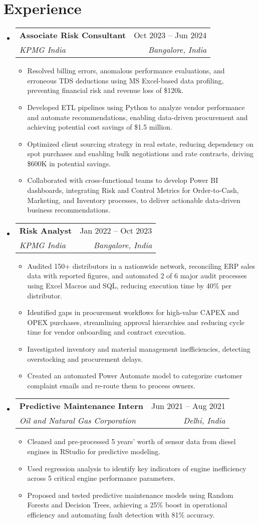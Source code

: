 \documentclass[letterpaper,11pt]{article}
\makeatletter
\newcommand{\resumeItem}[1]{
  \item\small{
    {#1 \vspace{-2pt}}
  }
}
\newcommand{\resumeSubheading}[4]{
  \vspace{-2pt}\item
    \begin{tabular*}{0.97\textwidth}[t]{l@{\extracolsep{\fill}}r}
      \textbf{#1} & #2 \\
      \textit{\small#3} & \textit{\small #4} \\
    \end{tabular*}\vspace{-7pt}
}
\newcommand{\resumeSubHeadingListStart}{\begin{itemize}[leftmargin=0.15in, label={}]}
\newcommand{\resumeSubHeadingListEnd}{\end{itemize}}
\newcommand{\resumeItemListStart}{\begin{itemize}}
\newcommand{\resumeItemListEnd}{\end{itemize}\vspace{-5pt}}
\makeatother
\begin{document}
\section{Experience}
  \resumeSubHeadingListStart
    \resumeSubheading
      {Associate Risk Consultant}{Oct 2023 -- Jun 2024}
      {KPMG India}{Bangalore, India}
      \resumeItemListStart
        \resumeItem{Resolved billing errors, anomalous performance evaluations, and erroneous TDS deductions using MS Excel-based data profiling, preventing financial risk and revenue loss of \$120k.}
        \resumeItem{Developed ETL pipelines using Python to analyze vendor performance and automate recommendations, enabling data-driven procurement and achieving potential cost savings of \$1.5 million.}
        \resumeItem{Optimized client sourcing strategy in real estate, reducing dependency on spot purchases and enabling bulk negotiations and rate contracts, driving \$600K in potential savings.}
        \resumeItem{Collaborated with cross-functional teams to develop Power BI dashboards, integrating Risk and Control Metrics for Order-to-Cash, Marketing, and Inventory processes, to deliver actionable data-driven business recommendations.}
      \resumeItemListEnd
    \resumeSubheading
      {Risk Analyst}{Jan 2022 -- Oct 2023}
      {KPMG India}{Bangalore, India}
      \resumeItemListStart
        \resumeItem{Audited 150+ distributors in a nationwide network, reconciling ERP sales data with reported figures, and automated 2 of 6 major audit processes using Excel Macros and SQL, reducing execution time by 40\% per distributor.}
        \resumeItem{Identified gaps in procurement workflows for high-value CAPEX and OPEX purchases, streamlining approval hierarchies and reducing cycle time for vendor onboarding and contract execution.}
        \resumeItem{Investigated inventory and material management inefficiencies, detecting overstocking and procurement delays.}
        \resumeItem{Created an automated Power Automate model to categorize customer complaint emails and re-route them to process owners.}
      \resumeItemListEnd
    \resumeSubheading
      {Predictive Maintenance Intern}{Jun 2021 -- Aug 2021}
      {Oil and Natural Gas Corporation}{Delhi, India}
      \resumeItemListStart
        \resumeItem{Cleaned and pre-processed 5 years' worth of sensor data from diesel engines in RStudio for predictive modeling.}
        \resumeItem{Used regression analysis to identify key indicators of engine inefficiency across 5 critical engine performance parameters.}
        \resumeItem{Proposed and tested predictive maintenance models using Random Forests and Decision Trees, achieving a 25\% boost in operational efficiency and automating fault detection with 81\% accuracy.}
      \resumeItemListEnd
  \resumeSubHeadingListEnd
\end{document}

